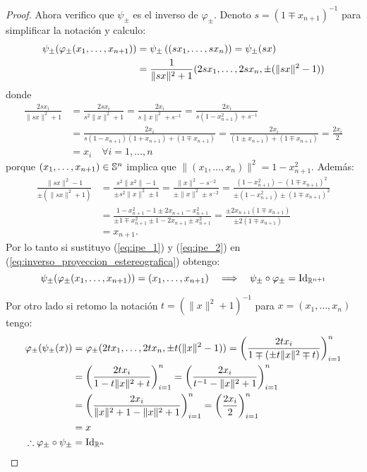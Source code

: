 \begin{proof}
  Ahora verifico que $\psi_{\pm}$ es el inverso de $\varphi_{\pm}$. Denoto $s=(1\mp x_{n+1})^{-1}$
  para simplificar la notaci\'on y calculo:
  \begin{align}
    \psi_{\pm}(\varphi_{\pm}(x_1,\ldots,x_{n+1})) & =
    \psi_{\pm}\left( (s x_1,\ldots,s x_n) \right)=\psi_{\pm}(sx) \nonumber \\ & =
    \frac{1}{\|sx\|^2+1}(2sx_1,\ldots,2sx_n,\pm(\|sx\|^2-1)) \label{eq:inverso_proyeccion_estereografica}
  \end{align}
  donde
  \begin{align}
    \frac{2s x_i}{\|s x\|^2+1} & =
    \frac{2s x_i}{s^2\|x\|^2+1} =
    \frac{2x_i}{s\|x\|^2+s^{-1}} =
    \frac{2x_i}{s(1-x_{n+1}^2)+s^{-1}} \nonumber \\ & =
    \frac{2x_i}{s(1-x_{n+1})(1+x_{n+1})+(1\mp x_{n+1})} =
    \frac{2x_i}{(1\pm x_{n+1})+(1\mp x_{n+1})} =
    \frac{2x_i}{2} \nonumber\\ & =
    x_i \quad \forall i=1,\ldots,n \label{eq:ipe_1}
  \end{align}
  porque $(x_1,\ldots,x_{n+1})\in\mathbb{S}^n$ implica que $\|(x_1,\ldots,x_n)\|^2=1-x_{n+1}^2$. Adem\'as:
  \begin{align}
    \frac{\|sx\|^2-1}{\pm(\|sx\|^2+1)} &=
    \frac{ s^2\|x^2\|- 1}{\pm s^2\|x\|^2 \pm 1}=
    \frac{\|x\|^2 - s^{-2}}{\pm \|x\|^2\pm s^{-2}}=
    \frac{(1-x_{n+1}^2) - (1\mp x_{n+1})^2}{\pm(1-x_{n+1}^2)\pm (1\mp x_{n+1})^2} \nonumber\\ & =
    \frac{1-x_{n+1}^2-1\pm 2x_{n+1}- x_{n+1}^2}{\pm1\mp x_{n+1}^2\pm 1-2x_{n+1}\pm x_{n+1}^2}=
    \frac{\pm 2x_{n+1}(1\mp x_{n+1})}{\pm 2(1\mp x_{n+1})}\nonumber\\ & =
    x_{n+1}. \label{eq:ipe_2}
  \end{align}
  Por lo tanto si sustituyo (\ref{eq:ipe_1}) y (\ref{eq:ipe_2}) en
  (\ref{eq:inverso_proyeccion_estereografica}) obtengo:
  \[
    \psi_{\pm}(\varphi_{\pm}(x_1,\ldots,x_{n+1}))=(x_1,\ldots,x_{n+1}) \quad\Longrightarrow\quad
    \psi_{\pm}\circ\varphi_{\pm}=\text{Id}_{\mathbb{R}^{n+1}}
  \]

  Por otro lado si retomo la notaci\'on $t=(\|x\|^2+1)^{-1}$ para $x=(x_1,\ldots,x_n)$ tengo:
  \begin{align*}
    \varphi_{\pm}(\psi_{\pm}(x))& =
    \varphi_{\pm}(2tx_1,\ldots,2tx_n,\pm t(\|x\|^2-1))=
    \left( \frac{2tx_i}{1\mp (\pm t\|x\|^2\mp t)} \right)_{i=1}^n\\ & =
    \left( \frac{2tx_i}{1-t\|x\|^2+t} \right)_{i=1}^n=
    \left( \frac{2x_i}{t^{-1}-\|x\|^2+1} \right)_{i=1}^n \\ &=
    \left( \frac{2x_i}{\|x\|^2+1-\|x\|^2+1} \right)_{i=1}^n=
    \left( \frac{2x_i}{2} \right)_{i=1}^n \\ & =
    x \\
    \therefore \varphi_{\pm}\circ\psi_{\pm} &=\text{Id}_{\mathbb{R}^n}
  \end{align*}


\end{proof}

